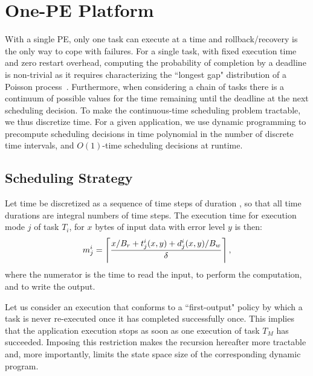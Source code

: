 \chapter{One-PE Platform}
\label{sec:onehost}

With a single PE, only one task can execute at a time and rollback/recovery is the only way to cope with failures.  For a single task, with fixed execution time and zero restart overhead, computing the probability of completion by a deadline is non-trivial as it requires characterizing the ``longest gap" distribution of a Poisson process~\cite{OMWONYLEE2020124194}.  Furthermore, when considering a chain of tasks there is a continuum of possible values for the time remaining until the deadline at the next scheduling decision.  To make the continuous-time scheduling problem tractable, we thus discretize time. 
For a given application, we use dynamic programming to precompute scheduling decisions in time polynomial in the number of discrete time intervals, and $O(1)$-time scheduling decisions at runtime.


\section{Scheduling Strategy}
\label{sec:onehost:solution}

Let time be discretized as a sequence of time steps 
of duration \deltat, so that all time durations are
integral numbers of time steps. The execution time for 
execution mode $j$ of task $T_i$, for $x$ bytes of input data 
with error level $y$ is then: 
$$
m^i_j = \left\lceil \frac{x/B_r + t^i_j(x,y) + d^i_j(x,y)/B_w}{\delta} \right\rceil ,
$$
\noindent
where the numerator is the time to read the input, to perform
the computation, and to write the output. 

Let us consider an execution that conforms to a ``first-output" policy
by which a task is never re-executed once it has completed
successfully once.  This implies that the application execution stops as
soon as one execution of task $T_M$ has succeeded. Imposing this
restriction makes the recursion hereafter more tractable and, more
importantly, limits the state space size of the corresponding dynamic program.

